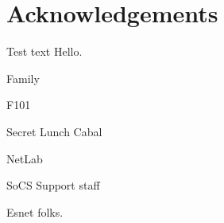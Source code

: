 \chapter*{Acknowledgements}

Test text Hello.

Family

F101

Secret Lunch Cabal

NetLab

SoCS Support staff

Esnet folks.